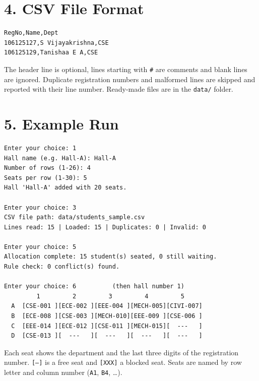 \documentclass[a4paper,12pt]{article}
\begin{document}
\section*{4. CSV File Format}
\begin{verbatim}
RegNo,Name,Dept
106125127,S Vijayakrishna,CSE
106125129,Tanishaa E A,CSE
\end{verbatim}
The header line is optional, lines starting with \texttt{\#} are comments and blank lines are ignored. Duplicate registration numbers and malformed lines are skipped and reported with their line number. Ready-made files are in the \texttt{data/} folder.

\section*{5. Example Run}
\begin{verbatim}
Enter your choice: 1
Hall name (e.g. Hall-A): Hall-A
Number of rows (1-26): 4
Seats per row (1-30): 5
Hall 'Hall-A' added with 20 seats.

Enter your choice: 3
CSV file path: data/students_sample.csv
Lines read: 15 | Loaded: 15 | Duplicates: 0 | Invalid: 0

Enter your choice: 5
Allocation complete: 15 student(s) seated, 0 still waiting.
Rule check: 0 conflict(s) found.

Enter your choice: 6          (then hall number 1)
         1         2         3         4         5
  A  [CSE-001 ][ECE-002 ][EEE-004 ][MECH-005][CIVI-007]
  B  [ECE-008 ][CSE-003 ][MECH-010][EEE-009 ][CSE-006 ]
  C  [EEE-014 ][ECE-012 ][CSE-011 ][MECH-015][  ---   ]
  D  [CSE-013 ][  ---   ][  ---   ][  ---   ][  ---   ]
\end{verbatim}
Each seat shows the department and the last three digits of the registration number. \texttt{[---]} is a free seat and \texttt{[XXX]} a blocked seat. Seats are named by row letter and column number (\texttt{A1}, \texttt{B4}, \dots).
\end{document}
